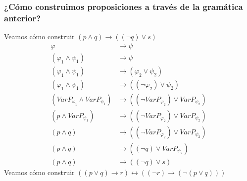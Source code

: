 \documentclass[a4paper]{article}
\begin{document}
\subsubsection{¿Cómo construimos proposiciones a través de la gramática anterior?}
\noindent
Veamos cómo construir \(\left(p \land q\right) \rightarrow \left(\left(\neg q \right) \lor s\right)\)
\begin{align*}
    \varphi &\rightarrow \psi \\
    \left(\varphi_{1} \land \psi_{1} \right) &\rightarrow \psi \\
    \left(\varphi_{1} \land \psi_{1} \right) &\rightarrow \left(\varphi_{2} \lor \psi_{2} \right) \\
    \left(\varphi_{1} \land \psi_{1} \right) &\rightarrow \left(\left(\neg \varphi_{2}\right) \lor \psi_{2} \right) \\
    \left(VarP_{\varphi_{1}} \land VarP_{\psi_{1}} \right) &\rightarrow \left(\left(\neg VarP_{\varphi_{2}}\right) \lor VarP_{\psi_{2}} \right) \\
    \left(p \land VarP_{\psi_{1}} \right) &\rightarrow \left(\left(\neg VarP_{\varphi_{2}}\right) \lor VarP_{\psi_{2}} \right) \\
    \left(p \land q \right) &\rightarrow \left(\left(\neg VarP_{\varphi_{2}}\right) \lor VarP_{\psi_{2}} \right) \\
    \left(p \land q \right) &\rightarrow \left(\left(\neg q\right) \lor VarP_{\psi_{2}} \right) \\
    \left(p \land q \right) &\rightarrow \left(\left(\neg q\right) \lor s \right)
\end{align*}
Veamos cómo construir \(\left(\left(p \lor q\right) \rightarrow r\right) \leftrightarrow \left(\left(\neg r\right) \rightarrow \left(\neg\left(p \lor q\right)\right) \right)\)
\end{document}
